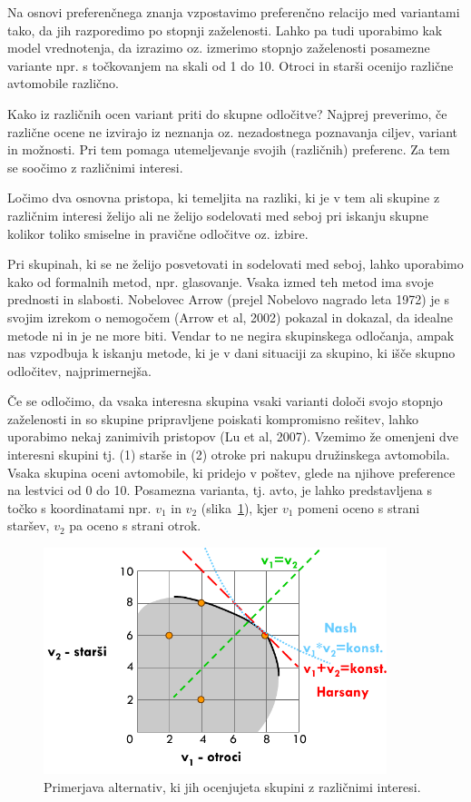 Na osnovi preferenčnega znanja vzpostavimo preferenčno relacijo med variantami tako, da jih razporedimo po stopnji zaželenosti. Lahko pa tudi uporabimo kak model vrednotenja, da izrazimo oz. izmerimo stopnjo zaželenosti  posamezne variante npr. s točkovanjem na skali od 1 do 10. Otroci in starši ocenijo različne avtomobile različno. 

Kako iz različnih ocen variant priti do skupne odločitve? Najprej preverimo, če različne ocene ne izvirajo iz neznanja oz. nezadostnega poznavanja ciljev, variant in možnosti. Pri tem pomaga utemeljevanje svojih (različnih) preferenc. Za tem se soočimo z različnimi interesi.

Ločimo dva osnovna pristopa, ki temeljita na razliki, ki je v tem ali skupine z različnim interesi želijo ali ne želijo sodelovati med seboj pri iskanju skupne kolikor toliko smiselne in pravične odločitve oz. izbire.

Pri skupinah, ki se ne želijo posvetovati in sodelovati med seboj, lahko uporabimo kako od formalnih metod, npr. glasovanje. Vsaka izmed teh metod ima svoje prednosti in slabosti. Nobelovec Arrow (prejel Nobelovo nagrado leta 1972) je s svojim izrekom o nemogočem (Arrow et al, 2002) pokazal in dokazal, da idealne metode ni in je ne more biti. Vendar to ne negira skupinskega odločanja, ampak nas vzpodbuja k iskanju metode, ki je v dani situaciji za skupino, ki išče skupno odločitev, najprimernejša.

Če se odločimo, da vsaka interesna skupina vsaki varianti določi svojo stopnjo zaželenosti in so skupine pripravljene poiskati kompromisno rešitev, lahko uporabimo nekaj zanimivih pristopov (Lu et al, 2007). Vzemimo že omenjeni dve interesni skupini tj. (1) starše in (2) otroke pri nakupu družinskega avtomobila. Vsaka skupina oceni avtomobile, ki pridejo v poštev, glede na njihove preference na lestvici od 0 do 10. Posamezna varianta, tj. avto, je lahko predstavljena s točko s koordinatami npr. $v_1$ in $v_2$ (slika~\ref{f-primerjava-alternative}), kjer $v_1$ pomeni oceno s strani staršev, $v_2$ pa oceno s strani otrok.

\begin{figure}[htbp]
\begin{center}
\includegraphics[width=10cm]{slike/primerjava-alternative.pdf}
\caption{Primerjava alternativ, ki jih ocenjujeta skupini z različnimi interesi.}
\label{f-primerjava-alternative}
\end{center}
\end{figure}

